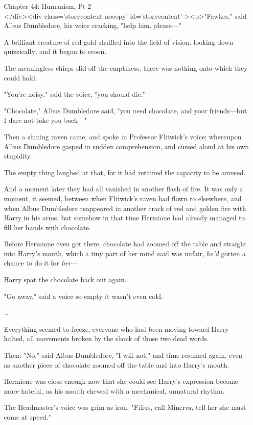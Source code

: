 
Chapter 44: Humanism, Pt 2\\
</div><div  class='storycontent nocopy' id='storycontent' ><p>"Fawkes," said Albus Dumbledore, his voice cracking, "help him, please---"

A brilliant creature of red-gold shuffled into the field of vision, looking down quizzically; and it began to croon.

The meaningless chirps slid off the emptiness, there was nothing onto which they could hold.

"You're noisy," said the voice, "you should die."

"Chocolate," Albus Dumbledore said, "you need chocolate, and your friends---but I dare not take you back---"

Then a shining raven came, and spoke in Professor Flitwick's voice; whereupon Albus Dumbledore gasped in sudden comprehension, and cursed aloud at his own stupidity.

The empty thing laughed at that, for it had retained the capacity to be amused.

And a moment later they had all vanished in another flash of fire.
\sbreak
It was only a moment, it seemed, between when Flitwick's raven had flown to elsewhere, and when Albus Dumbledore reappeared in another crack of red and golden fire with Harry in his arms; but somehow in that time Hermione had already managed to fill her hands with chocolate.

Before Hermione even got there, chocolate had zoomed off the table and straight into Harry's mouth, which a tiny part of her mind said was unfair, \emph{he'd} gotten a chance to do it for \emph{her---}

Harry spat the chocolate back out again.

"Go away," said a voice so empty it wasn't even cold.

{\ldots}

Everything seemed to freeze, everyone who had been moving toward Harry halted, all movements broken by the shock of those two dead words.

Then: "No," said Albus Dumbledore, "I will not," and time resumed again, even as another piece of chocolate zoomed off the table and into Harry's mouth.

Hermione was close enough now that she could see Harry's expression become more hateful, as his mouth chewed with a mechanical, unnatural rhythm.

The Headmaster's voice was grim as iron. "Filius, call Minerva, tell her she must come at speed."

